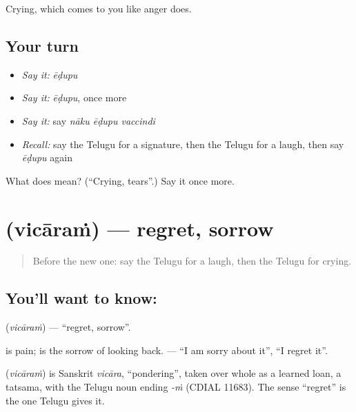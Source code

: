 \begin{grammarlens}[title={What you've built}]
Crying, which comes to you like anger does.
\end{grammarlens}

\subsection*{Your turn}
\begin{itemize}
\raggedright
  \item \emph{Say it:} \emph{ēḍupu}
  \item \emph{Say it:} \emph{ēḍupu}, once more
  \item \emph{Say it:} say \emph{nāku ēḍupu vaccindi}
  \item \emph{Recall:} say the Telugu for a signature, then the Telugu for a laugh, then say \emph{ēḍupu} again
\end{itemize}

\begin{tcolorbox}[breakable,colback=teal!4,colframe=teal!35!black,title={Before you move on}]
What does  mean? (\textquotedblleft{}Crying, tears\textquotedblright{}.) Say it once more.
\end{tcolorbox}
\section[\texorpdfstring{\te{విచారం} (vicāraṁ)}{విచారం (vicāraṁ)}]{ (vicāraṁ) — regret, sorrow}

\label{lesson:TE-C97-regret}



\begin{quote}
Before the new one: say the Telugu for a laugh, then the Telugu for crying.
\end{quote}

\subsection*{You'll want to know: }
\textbf{} (\emph{vicāraṁ}) — \textquotedblleft{}regret, sorrow\textquotedblright{}.

\textbf{} is pain; \textbf{} is the sorrow of looking back. \textbf{ } — \textquotedblleft{}I am sorry about it\textquotedblright{}, \textquotedblleft{}I regret it\textquotedblright{}.

\begin{cousinweb}
\textbf{} (\emph{vicāraṁ}) is Sanskrit \emph{vicāra}, \textquotedblleft{}pondering\textquotedblright{}, taken over whole as a learned loan, a tatsama, with the Telugu noun ending \emph{-ṁ} (CDIAL 11683). The sense \textquotedblleft{}regret\textquotedblright{} is the one Telugu gives it.
\end{cousinweb}

